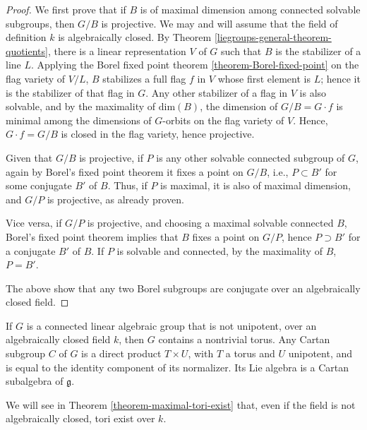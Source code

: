 \begin{proof}
 

 We first prove that if $B$ is of maximal dimension among connected solvable subgroups, then $G/B$ is projective. We may and will assume that the field of definition $k$ is algebraically closed. By Theorem \ref{liegroups-general-theorem-quotients}, there is a linear representation $V$ of $G$ such that $B$ is the stabilizer of a line $L$. Applying the Borel fixed point theorem \ref{theorem-Borel-fixed-point} on the flag variety of $V/L$, $B$ stabilizes a full flag $f$ in $V$ whose first element is $L$; hence it is the stabilizer of that flag in $G$. Any other stabilizer of a flag in $V$ is also solvable, and by the maximality of $\text{dim}(B)$, the dimension of $G/B = G\cdot f$ is minimal among the dimensions of $G$-orbits on the flag variety of $V$. Hence, $G\cdot f = G/B$ is closed in the flag variety, hence projective. 
 
 Given that $G/B$ is projective, if $P$ is any other solvable connected subgroup of $G$, again by Borel's fixed point theorem it fixes a point on $G/B$, i.e., $P\subset B'$ for some conjugate $B'$ of $B$. Thus, if $P$ is maximal, it is also of maximal dimension, and $G/P$ is projective, as already proven. 
 
 
 Vice versa, if $G/P$ is projective, and choosing a maximal solvable connected $B$, Borel's fixed point theorem implies that $B$ fixes a point on $G/P$, hence $P\supset B'$ for a conjugate $B'$ of $B$. If $P$ is solvable and connected, by the maximality of $B$, $P=B'$.
 
 The above show that any two Borel subgroups are conjugate over an algebraically closed field. 
\end{proof}

\begin{proposition}
\label{proposition-unipotent-torus}
If $G$ is a connected linear algebraic group that is not unipotent, over an algebraically closed field $k$, then $G$ contains a nontrivial torus. Any Cartan subgroup $C$ of $G$ is a direct product $T\times U$, with $T$ a torus and $U$ unipotent, and is equal to the identity component of its normalizer. Its Lie algebra is a Cartan subalgebra of $\mathfrak g$.
\end{proposition}

We will see in Theorem \ref{theorem-maximal-tori-exist} that, even if the field is not algebraically closed, tori exist over $k$.

